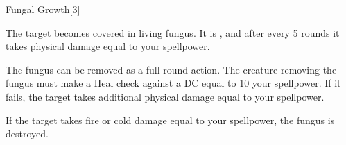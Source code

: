 \begin{spellsection}{Fungal Growth}[3]
    \begin{spellheader}
    \end{spellheader}
    \begin{spellcontent}
        \begin{spelltargetinginfo}
        \end{spelltargetinginfo}
        \begin{spelleffects}
            \spelleffect The target becomes covered in living fungus. It is \sickened, and after every 5 rounds it takes physical damage equal to your spellpower.

            The fungus can be removed as a full-round action. The creature removing the fungus must make a Heal check against a DC equal to 10 \add your spellpower. If it fails, the target takes additional physical damage equal to your spellpower.

            If the target takes fire or cold damage equal to your spellpower, the fungus is destroyed.
        \end{spelleffects}
    \end{spellcontent}
    \begin{spellfooter}
        \miscastexplode
    \end{spellfooter}
\end{spellsection}


